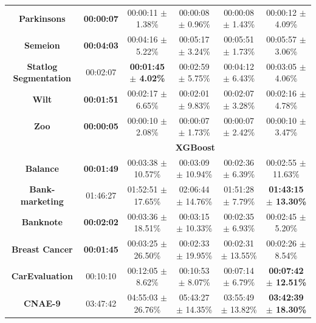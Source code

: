\documentclass[iicol]{sn-jnl}
\theoremstyle{thmstyleone}%
\theoremstyle{thmstyletwo}%
\theoremstyle{thmstylethree}%
\begin{document}
\begin{table}
{\begin{tabular}{cccccc}
\textbf{Parkinsons}             & \textbf{00:00:07} & 00:00:11 $\pm$ 1.38\%           & 00:00:08 $\pm$ 0.96\%      & 00:00:08 $\pm$ 1.43\%          & 00:00:12 $\pm$ 4.09\%           \\
\textbf{Semeion}                & \textbf{00:04:03} & 00:04:16 $\pm$ 5.22\%           & 00:05:17 $\pm$ 3.24\%      & 00:05:51 $\pm$ 1.73\%          & 00:05:57 $\pm$ 3.06\%           \\
\textbf{Statlog   Segmentation} & 00:02:07          & \textbf{00:01:45 $\pm$ 4.02\%}  & 00:02:59 $\pm$ 5.75\%      & 00:04:12 $\pm$ 6.43\%          & 00:03:05 $\pm$ 4.06\%           \\
\textbf{Wilt}                   & \textbf{00:01:51} & 00:02:17 $\pm$ 6.65\%           & 00:02:01 $\pm$ 9.83\%      & 00:02:07 $\pm$ 3.28\%          & 00:02:16 $\pm$ 4.78\%           \\
\textbf{Zoo}                    & \textbf{00:00:05} & 00:00:10 $\pm$ 2.08\%           & 00:00:07 $\pm$ 1.73\%      & 00:00:07 $\pm$ 2.42\%          & 00:00:10 $\pm$ 3.47\%           \\ \hline
                                & \multicolumn{5}{c}{\textbf{XGBoost}}                                                                                                \\ \hline
\textbf{Balance}                & \textbf{00:01:49} & 00:03:38 $\pm$ 10.57\%          & 00:03:09 $\pm$ 10.94\%     & 00:02:36 $\pm$ 6.39\%          & 00:02:55 $\pm$ 11.63\%          \\
\textbf{Bank-marketing}         & 01:46:27          & 01:52:51 $\pm$ 17.65\%          & 02:06:44 $\pm$ 14.76\%     & 01:51:28 $\pm$ 7.79\%          & \textbf{01:43:15 $\pm$ 13.30\%} \\
\textbf{Banknote}               & \textbf{00:02:02} & 00:03:36 $\pm$ 18.51\%          & 00:03:15 $\pm$ 10.33\%     & 00:02:35 $\pm$ 6.93\%          & 00:02:45 $\pm$ 5.20\%           \\
\textbf{Breast Cancer}          & \textbf{00:01:45} & 00:03:25 $\pm$ 26.50\%          & 00:02:33 $\pm$ 19.95\%     & 00:02:31 $\pm$ 13.55\%         & 00:02:26 $\pm$ 8.54\%           \\
\textbf{CarEvaluation}          & 00:10:10          & 00:12:05 $\pm$ 8.62\%           & 00:10:53 $\pm$ 8.07\%      & 00:07:14 $\pm$ 6.79\%          & \textbf{00:07:42 $\pm$ 12.51\%} \\
\textbf{CNAE-9}                 & 03:47:42          & 04:55:03 $\pm$ 26.76\%          & 05:43:27 $\pm$ 14.35\%     & 03:55:49 $\pm$ 13.82\%         & \textbf{03:42:39 $\pm$ 18.30\%} \\

\end{tabular}}
\end{table}
\end{document}
